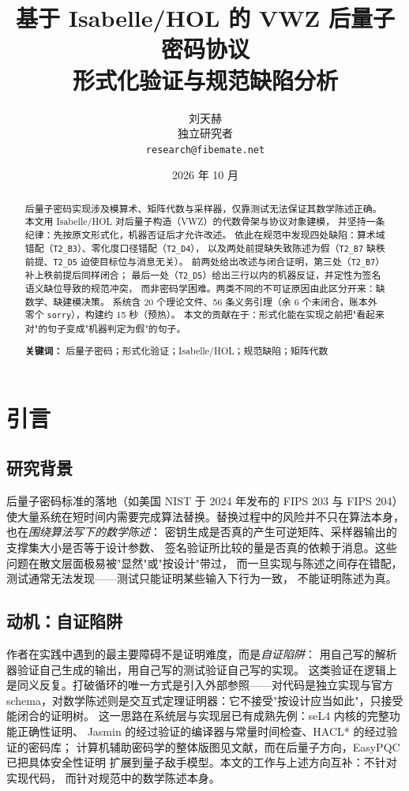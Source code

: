 \documentclass[UTF8,fontset=windows,zihao=-4,a4paper]{ctexart}
\title{\bfseries 基于 Isabelle/HOL 的 VWZ 后量子密码协议\\形式化验证与规范缺陷分析}
\author{刘天赫\\
\small 独立研究者\\
\small \texttt{research@fibemate.net}}
\date{2026 年 10 月}
\newcommand{\code}[1]{\texttt{#1}}
\begin{document}
\maketitle

\begin{abstract}
\noindent
后量子密码实现涉及模算术、矩阵代数与采样器，仅靠测试无法保证其数学陈述正确。
本文用 Isabelle/HOL 对后量子构造（VWZ）的代数骨架与协议对象建模，
并坚持一条纪律：先按原文形式化，机器否证后才允许改述。
依此在规范中发现四处缺陷：算术域错配（\code{T2\_B3}）、零化度口径错配（\code{T2\_D4}），
以及两处前提缺失致陈述为假（\code{T2\_B7} 缺秩前提、\code{T2\_D5} 迫使目标位与消息无关）。
前两处给出改述与闭合证明，第三处（\code{T2\_B7}）补上秩前提后同样闭合；
最后一处（\code{T2\_D5}）给出三行以内的机器反证，并定性为签名语义缺位导致的规范冲突，
而非密码学困难。两类不同的不可证原因由此区分开来：缺数学、缺建模决策。
系统含 20 个理论文件、56 条义务引理（余 6 个未闭合，账本外零个 \code{sorry}），构建约 15 秒（预热）。
本文的贡献在于：形式化能在实现之前把"看起来对"的句子变成"机器判定为假"的句子。

\vspace{0.6em}
\noindent\textbf{关键词：} 后量子密码；形式化验证；Isabelle/HOL；规范缺陷；矩阵代数
\end{abstract}


\section{引言}

\subsection{研究背景}
后量子密码标准的落地（如美国 NIST 于 2024 年发布的 FIPS 203 与 FIPS 204\cite{fips203,fips204}）
使大量系统在短时间内需要完成算法替换\cite{bl}。替换过程中的风险并不只在算法本身，也在\emph{围绕算法写下的数学陈述}：
密钥生成是否真的产生可逆矩阵、采样器输出的支撑集大小是否等于设计参数、
签名验证所比较的量是否真的依赖于消息。这些问题在散文层面极易被"显然"或"按设计"带过，
而一旦实现与陈述之间存在错配，测试通常无法发现——测试只能证明某些输入下行为一致，
不能证明陈述为真。

\subsection{动机：自证陷阱}
作者在实践中遇到的最主要障碍不是证明难度，而是\emph{自证陷阱}：
用自己写的解析器验证自己生成的输出，用自己写的测试验证自己写的实现。
这类验证在逻辑上是同义反复。打破循环的唯一方式是引入外部参照——对代码是独立实现与官方
schema，对数学陈述则是交互式定理证明器：它不接受"按设计应当如此"，只接受能闭合的证明树。
这一思路在系统层与实现层已有成熟先例：seL4 内核的完整功能正确性证明\cite{sel4}、
Jasmin 的经过验证的编译器与常量时间检查\cite{jasmin}、HACL* 的经过验证的密码库\cite{hacl}；
计算机辅助密码学的整体版图见文献\cite{sok}，而在后量子方向，EasyPQC 已把具体安全性证明
扩展到量子敌手模型\cite{easypqc}。本文的工作与上述方向互补：不针对实现代码，
而针对规范中的数学陈述本身。
\end{document}
